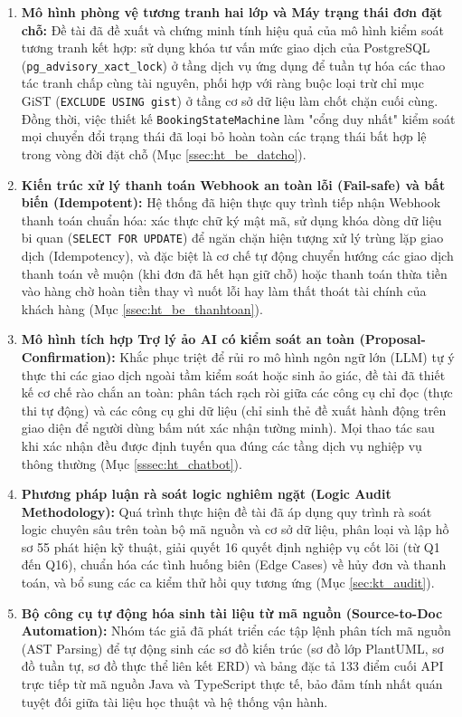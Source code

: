 \begin{enumerate}
    \item \textbf{Mô hình phòng vệ tương tranh hai lớp và Máy trạng thái đơn đặt chỗ:} Đề tài đã đề xuất và chứng minh tính hiệu quả của mô hình kiểm soát tương tranh kết hợp: sử dụng khóa tư vấn mức giao dịch của PostgreSQL (\texttt{pg\_advisory\_xact\_lock}) ở tầng dịch vụ ứng dụng để tuần tự hóa các thao tác tranh chấp cùng tài nguyên, phối hợp với ràng buộc loại trừ chỉ mục GiST (\texttt{EXCLUDE USING gist}) ở tầng cơ sở dữ liệu làm chốt chặn cuối cùng. Đồng thời, việc thiết kế \texttt{BookingStateMachine} làm "cổng duy nhất" kiểm soát mọi chuyển đổi trạng thái đã loại bỏ hoàn toàn các trạng thái bất hợp lệ trong vòng đời đặt chỗ (Mục \ref{ssec:ht_be_datcho}).
    
    \item \textbf{Kiến trúc xử lý thanh toán Webhook an toàn lỗi (Fail-safe) và bất biến (Idempotent):} Hệ thống đã hiện thực quy trình tiếp nhận Webhook thanh toán chuẩn hóa: xác thực chữ ký mật mã, sử dụng khóa dòng dữ liệu bi quan (\texttt{SELECT FOR UPDATE}) để ngăn chặn hiện tượng xử lý trùng lặp giao dịch (Idempotency), và đặc biệt là cơ chế tự động chuyển hướng các giao dịch thanh toán về muộn (khi đơn đã hết hạn giữ chỗ) hoặc thanh toán thừa tiền vào hàng chờ hoàn tiền thay vì nuốt lỗi hay làm thất thoát tài chính của khách hàng (Mục \ref{ssec:ht_be_thanhtoan}).
    
    \item \textbf{Mô hình tích hợp Trợ lý ảo AI có kiểm soát an toàn (Proposal-Confirmation):} Khắc phục triệt để rủi ro mô hình ngôn ngữ lớn (LLM) tự ý thực thi các giao dịch ngoài tầm kiểm soát hoặc sinh ảo giác, đề tài đã thiết kế cơ chế rào chắn an toàn: phân tách rạch ròi giữa các công cụ chỉ đọc (thực thi tự động) và các công cụ ghi dữ liệu (chỉ sinh thẻ đề xuất hành động trên giao diện để người dùng bấm nút xác nhận tường minh). Mọi thao tác sau khi xác nhận đều được định tuyến qua đúng các tầng dịch vụ nghiệp vụ thông thường (Mục \ref{sssec:ht_chatbot}).
    
    \item \textbf{Phương pháp luận rà soát logic nghiêm ngặt (Logic Audit Methodology):} Quá trình thực hiện đề tài đã áp dụng quy trình rà soát logic chuyên sâu trên toàn bộ mã nguồn và cơ sở dữ liệu, phân loại và lập hồ sơ 55 phát hiện kỹ thuật, giải quyết 16 quyết định nghiệp vụ cốt lõi (từ Q1 đến Q16), chuẩn hóa các tình huống biên (Edge Cases) về hủy đơn và thanh toán, và bổ sung các ca kiểm thử hồi quy tương ứng (Mục \ref{sec:kt_audit}).
    
    \item \textbf{Bộ công cụ tự động hóa sinh tài liệu từ mã nguồn (Source-to-Doc Automation):} Nhóm tác giả đã phát triển các tập lệnh phân tích mã nguồn (AST Parsing) để tự động sinh các sơ đồ kiến trúc (sơ đồ lớp PlantUML, sơ đồ tuần tự, sơ đồ thực thể liên kết ERD) và bảng đặc tả 133 điểm cuối API trực tiếp từ mã nguồn Java và TypeScript thực tế, bảo đảm tính nhất quán tuyệt đối giữa tài liệu học thuật và hệ thống vận hành.
\end{enumerate}

